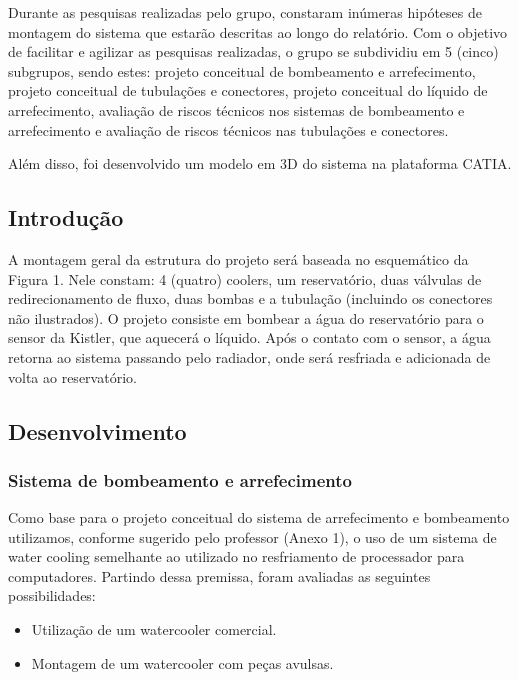Durante as pesquisas realizadas pelo grupo, constaram inúmeras hipóteses de montagem do sistema que estarão descritas ao longo do relatório. Com o objetivo de facilitar e agilizar as pesquisas realizadas, o grupo se subdividiu em 5 (cinco) subgrupos, sendo estes: projeto conceitual de bombeamento e arrefecimento, projeto conceitual de tubulações e conectores, projeto conceitual do líquido de arrefecimento, avaliação de riscos técnicos nos sistemas de bombeamento e arrefecimento e avaliação de riscos técnicos nas tubulações e conectores. 

Além disso, foi desenvolvido um modelo em 3D do sistema na plataforma CATIA.

\subsection{Introdução}

A montagem geral da estrutura do projeto será baseada no esquemático da Figura 1. Nele constam: 4 (quatro) coolers, um reservatório, duas válvulas de redirecionamento de fluxo, duas bombas e a tubulação (incluindo os conectores não ilustrados). O projeto consiste em bombear a água do reservatório para o sensor da Kistler, que aquecerá o líquido. Após o contato com o sensor, a água retorna ao sistema passando pelo radiador, onde será resfriada e adicionada de volta ao reservatório.

\subsection{Desenvolvimento}

\subsubsection{Sistema de bombeamento e arrefecimento}

Como base para o projeto conceitual do sistema de arrefecimento e bombeamento utilizamos, conforme sugerido pelo professor (Anexo 1), o uso de um sistema de water cooling semelhante ao utilizado no resfriamento de processador para computadores. Partindo dessa premissa, foram avaliadas as seguintes possibilidades:

\begin{itemize}
\item Utilização de um watercooler comercial.
\item Montagem de um watercooler com peças avulsas.
\end{itemize}

